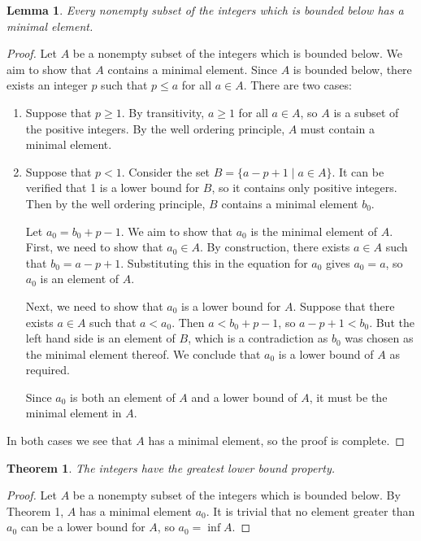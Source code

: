 \documentclass[12pt]{article}
\newtheorem{lemma}{Lemma}
\newtheorem{theorem}{Theorem}
\begin{document}
\begin{lemma}
  Every nonempty subset of the integers which is bounded below has a minimal
  element.
\end{lemma}

\begin{proof}
  Let \(A\) be a nonempty subset of the integers which is bounded below. We aim
  to show that \(A\) contains a minimal element. Since \(A\) is bounded below,
  there exists an integer \(p\) such that \(p \leq a\) for all \(a \in A\).
  There are two cases:

  \begin{enumerate}
    \item Suppose that \(p \geq 1\). By transitivity, \(a \geq 1\) for all \(a
      \in A\), so \(A\) is a subset of the positive integers. By the well
      ordering principle, \(A\) must contain a minimal element.

    \item Suppose that \(p < 1\). Consider the set \(B = \{a - p + 1 \mid a \in
      A\}\). It can be verified that 1 is a lower bound for \(B\), so it
      contains only positive integers. Then by the well ordering principle,
      \(B\) contains a minimal element \(b_0\).

      Let \(a_0 = b_0 + p - 1\). We aim to show that \(a_0\) is the minimal
      element of \(A\). First, we need to show that \(a_0 \in A\). By
      construction, there exists \(a \in A\) such that \(b_0 = a - p + 1\).
      Substituting this in the equation for \(a_0\) gives \(a_0 = a\), so
      \(a_0\) is an element of \(A\).

      Next, we need to show that \(a_0\) is a lower bound for \(A\). Suppose
      that there exists \(a \in A\) such that \(a < a_0\). Then \(a < b_0 + p -
      1\), so \(a - p + 1 < b_0\). But the left hand side is an element of
      \(B\), which is a contradiction as \(b_0\) was chosen as the minimal
      element thereof. We conclude that \(a_0\) is a lower bound of \(A\) as
      required.

      Since \(a_0\) is both an element of \(A\) and a lower bound of \(A\), it
      must be the minimal element in \(A\).
  \end{enumerate}

  In both cases we see that \(A\) has a minimal element, so the proof is
  complete.
\end{proof}

\begin{theorem}
  The integers have the greatest lower bound property.
\end{theorem}

\begin{proof}
  Let \(A\) be a nonempty subset of the integers which is bounded below. By
  Theorem 1, \(A\) has a minimal element \(a_0\). It is trivial that no element
  greater than \(a_0\) can be a lower bound for \(A\), so \(a_0 = \inf{A}\).
\end{proof}
\end{document}
